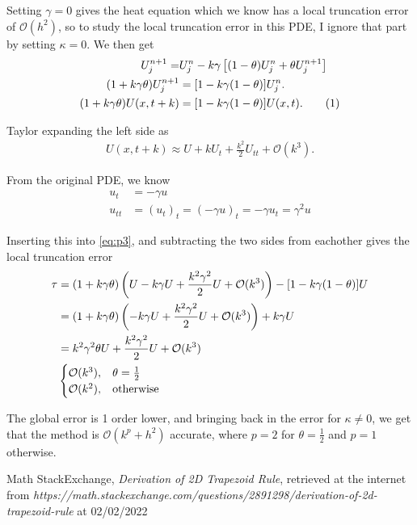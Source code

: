 \documentclass[aps, 12pt]{revtex4}
\newcommand\numberthis{\addtocounter{equation}{1}\tag{\theequation}}
\begin{document}
Setting $\gamma = 0$ gives the heat equation which we know has a local truncation error of $\mathcal{O}(h^2)$, so to study the local truncation error in this PDE, I ignore that part by setting $\kappa =0$.
We then get
\begin{align*}\label{eq:p3}
    U_j^{n+1}=                 & U_j^n - k\gamma\left[(1-\theta)U_j^n+\theta U_j^{n+1}\right]
    \\
    (1+k\gamma\theta)U_j^{n+1} & = [1-k\gamma(1-\theta)]U_j^n.
    \\
    (1+k\gamma\theta)U(x, t+k) & = [1-k\gamma(1-\theta)]U(x,t).\numberthis{}
\end{align*}

Taylor expanding the left side as
\begin{align*}
    U(x, t+k) \approx  U+kU_t+\frac{k^2}{2}U_{tt}+\mathcal{O}(k^3).
\end{align*}

From the original PDE, we know
\begin{align*}
    u_t    & =-\gamma u
    \\
    u_{tt} & =(u_t)_t = (-\gamma u)_t= -\gamma u_t = \gamma^2u
\end{align*}

Inserting this into \eqref{eq:p3}, and subtracting the two sides from eachother gives the local truncation error
\begin{align*}
    \tau & = (1+k\gamma\theta)\left(U-k\gamma U+\frac{k^2\gamma^2}{2}U+\mathcal{O}(k^3)\right) - [1-k\gamma(1-\theta)]U
    \\
         & = (1+k\gamma\theta)\left(-k\gamma U+\frac{k^2\gamma^2}{2}U+\mathcal{O}(k^3)\right) + k\gamma U
    \\
         & = k^2\gamma^2\theta U + \frac{k^2\gamma^2}{2}U +\mathcal{O}(k^3)
    \\
         & \begin{cases}
        \mathcal{O}(k^3), \hspace{3mm} \theta = \frac{1}{2}
        \\ \mathcal{O}(k^2), \hspace{3mm} \text{otherwise}
    \end{cases}
\end{align*}

The global error is 1 order lower, and bringing back in the error for $\kappa\neq0$, we get that the method is $\mathcal{O}(k^p+h^2)$ accurate, where $p=2$ for $\theta=\frac{1}{2}$ and $p=1$ otherwise.






\begin{thebibliography}{99}
     Math StackExchange, \textit{Derivation of 2D Trapezoid Rule}, retrieved at the internet from \textit{https://math.stackexchange.com/questions/2891298/derivation-of-2d-trapezoid-rule} at 02/02/2022
\end{thebibliography}
\end{document}
